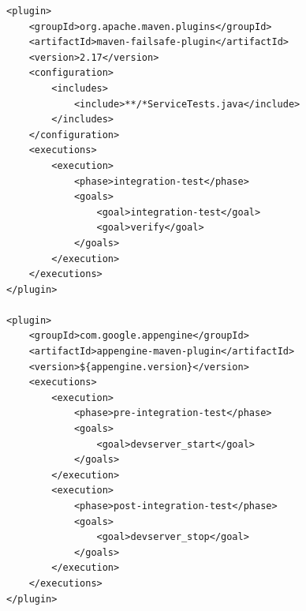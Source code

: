\begin{lstlisting}[caption=Integration Tests Configuration in CollaboraTeX]
<plugin>
    <groupId>org.apache.maven.plugins</groupId>
    <artifactId>maven-failsafe-plugin</artifactId>  
    <version>2.17</version>  
    <configuration>  
        <includes>  
            <include>**/*ServiceTests.java</include>
        </includes>  
    </configuration>  
    <executions>
        <execution>  
            <phase>integration-test</phase>
            <goals>  
                <goal>integration-test</goal>  
                <goal>verify</goal>
            </goals>  
        </execution>  
    </executions>  
</plugin>

<plugin>
    <groupId>com.google.appengine</groupId>
    <artifactId>appengine-maven-plugin</artifactId>
    <version>${appengine.version}</version>
    <executions>
        <execution>
            <phase>pre-integration-test</phase>
            <goals>
                <goal>devserver_start</goal>
            </goals>
        </execution>
        <execution>
            <phase>post-integration-test</phase>
            <goals>
                <goal>devserver_stop</goal>
            </goals>
        </execution>
    </executions>
</plugin>
\end{lstlisting}

\pagebreak


